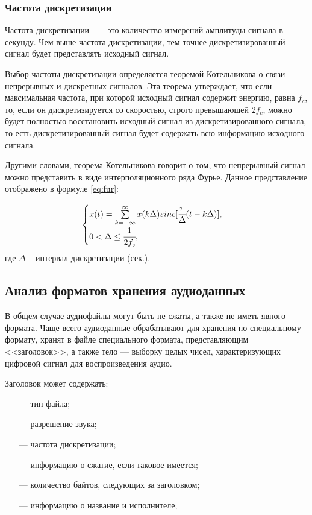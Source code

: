 	\subsubsection*{Частота дискретизации}
	
		\par Частота дискретизации —-- это количество измерений амплитуды сигнала в секунду. Чем выше частота дискретизации, тем точнее дискретизированный сигнал будет представлять исходный сигнал. 

		\par Выбор частоты дискретизации определяется теоремой Котельникова о связи непрерывных и дискретных сигналов. 
		Эта теорема утверждает, что если максимальная частота, при которой исходный сигнал содержит энергию, равна $f_{c}$, 
		то, если он дискретизируется со скоростью, строго превышающей $2f_{c}$, 
		можно будет полностью восстановить исходный сигнал из дискретизированного сигнала, 
		то есть дискретизированный сигнал будет содержать всю информацию исходного сигнала.
		
		\par Другими словами, теорема Котельникова говорит о том, что непрерывный сигнал можно представить в виде интерполяционного ряда Фурье.
		Данное представление отображено в формуле \ref{eq:fur}:

		\begin{equation}\label{eq:fur}
			\begin{cases}
				x(t) = \sum\limits^{\infty}_{k = -\infty}x(k\Delta)sinc[\cfrac{\pi}{\Delta}(t - k\Delta)], \\
				0 < \Delta \leq \cfrac{1}{2f_{c}},
			\end{cases}
		\end{equation}
		где $\Delta$ -- интервал дискретизации (сек.).
	
\subsection{Анализ форматов хранения аудиоданных}

	\par В общем случае аудиофайлы могут быть не сжаты, а также не иметь явного формата.
	Чаще всего аудиоданные обрабатывают для хранения по специальному формату, хранят в файле специального формата,
	представляющим <<заголовок>>, а также тело --- выборку целых чисел, характеризующих цифровой сигнал для воспроизведения аудио.

	\par Заголовок может содержать:
	\begin{itemize}
		\item[---] тип файла;
		\item[---] разрешение звука;
		\item[---] частота дискретизации;
		\item[---] информацию о сжатие, если таковое имеется;
		\item[---] количество байтов, следующих за заголовком;
		\item[---] ​​информацию о название и исполнителе;
	\end{itemize} 

